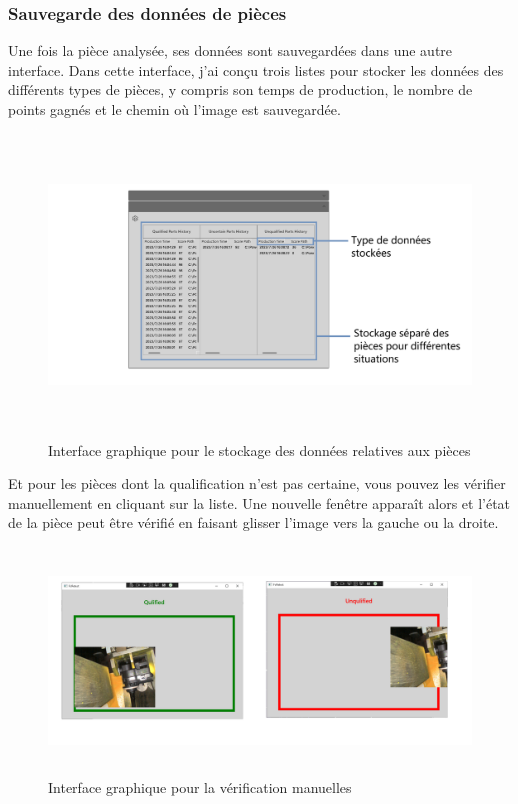 \subsubsection{Sauvegarde des données de pièces}
Une fois la pièce analysée, ses données sont sauvegardées dans une autre interface. Dans cette interface, j'ai conçu trois listes pour stocker les données des différents types de pièces, y compris son temps de production, le nombre de points gagnés et le chemin où l'image est sauvegardée. 
\begin{figure}[H]
    \centering
    \includegraphics[height=8cm]{ressources/images/check_parts.png}
    \caption{Interface graphique pour le stockage des données relatives aux pièces }
\end{figure}

Et pour les pièces dont la qualification n'est pas certaine, vous pouvez les vérifier manuellement en cliquant sur la liste. Une nouvelle fenêtre apparaît alors et l'état de la pièce peut être vérifié en faisant glisser l'image vers la gauche ou la droite. 
\begin{figure}[H]
    \centering
    \includegraphics[height=6cm]{ressources/images/check_manuel.png}
    \caption{Interface graphique pour la vérification manuelles}
\end{figure}

